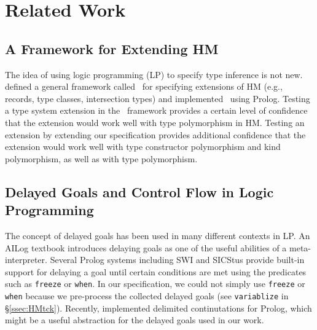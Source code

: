 \section{Related Work}\label{sec:relwork}
\subsection{A Framework for Extending HM}
The idea of using logic programming (LP) to specify type inference is not new.
\citet*{HMX99} defined a general framework called \HMX\ for specifying
extensions of HM (e.g., records, type classes, intersection types)
and \citet{tyinferCHR02} implemented \HMX\ using Prolog.
Testing a type system extension in the \HMX\ framework provides
a certain level of confidence that the extension would work well with
type polymorphism in HM. Testing an extension by extending our specification
provides additional confidence that the extension would work well with
type constructor polymorphism and kind polymorphism, as well as with
type polymorphism.

\subsection{Delayed Goals and Control Flow in Logic Programming}
The concept of delayed goals has been used in many different contexts in LP.
An AILog
	 textbook \cite{AILogTextBook}
introduces delaying goals as one of the useful abilities of a meta-interpreter.
Several Prolog systems including SWI and SICStus provide built-in support for
delaying a goal until certain conditions are met using the predicates
such as {\small\verb|freeze|} or {\small\verb|when|}. In our specification,
we could not simply use {\small\verb|freeze|} or {\small\verb|when|}
because we pre-process the collected delayed goals (see \verb|variablize|
in \S\ref{ssec:HMtck}).
Recently, \citet{SchDemDesWei13} implemented delimited continutations for
Prolog, which might be a useful abstraction for the delayed goals 
used in our work.

